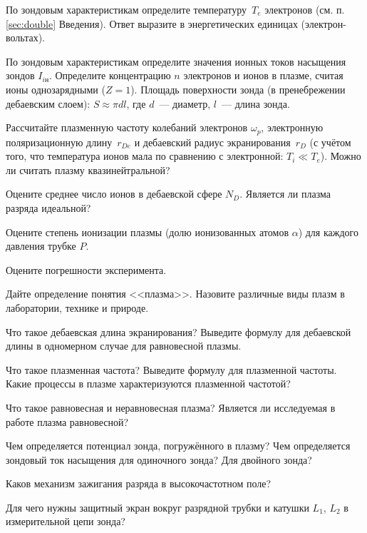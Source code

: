 \begin{lab:task}
\item По зондовым характеристикам определите температуру~$T_e$ электронов
(см. п. \ref{sec:double} Введения). Ответ
выразите в энергетических единицах (электрон-вольтах).

\item По зондовым характеристикам определите значения ионных токов насыщения
зондов $I_{iн}$. 
Определите концентрацию $n$ электронов и ионов в плазме, 
считая ионы однозарядными ($Z=1$).
Площадь поверхности зонда (в пренебрежении
дебаевским слоем): $S\approx \pi d l$, где 
$d$~--- диаметр, $l$~--- длина зонда.

\item Рассчитайте плазменную частоту колебаний электронов $\omega_p$,
электронную поляризационную длину~$r_{De}$ и дебаевский радиус экранирования~$r_D$
(с учётом того, что температура ионов мала по сравнению с электронной: $T_i\ll T_e$). 
Можно ли считать плазму квазинейтральной?

\item Оцените среднее число ионов в дебаевской сфере $N_D$. 
Является ли плазма разряда идеальной?

\item Оцените степень ионизации плазмы (долю ионизованных атомов $\alpha$)
для каждого давления трубке $P$.

\item Оцените погрешности эксперимента.

\end{lab:task}

\begin{lab:questions}
    \item Дайте определение понятия <<плазма>>. Назовите различные виды плазм в лаборатории, 
    технике и природе.
    
    \item Что такое дебаевская длина экранирования? Выведите формулу
    для дебаевской длины в одномерном случае для равновесной плазмы.
    
    \item Что такое плазменная частота? Выведите формулу для плазменной частоты.
    Какие процессы в плазме характеризуются плазменной частотой?

    \item Что такое равновесная и неравновесная плазма? 
    Является ли исследуемая в работе плазма равновесной?
        
    \item Чем определяется потенциал зонда, погружённого в плазму? 
    Чем определяется зондовый ток насыщения для одиночного зонда? Для двойного
    зонда?
    
    \item Каков механизм зажигания разряда в высокочастотном поле?
    
    \item Для чего нужны защитный экран вокруг разрядной трубки и катушки $L_1$, $L_2$ в измерительной
    цепи зонда?
\end{lab:questions}


